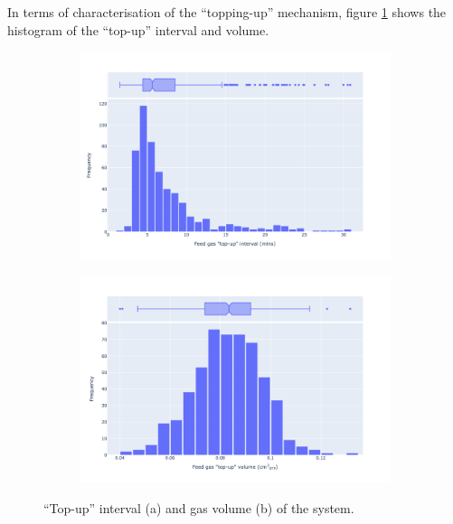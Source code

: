 In terms of characterisation of the ``topping-up'' mechanism, figure \ref{fig:top_up_characteristics} shows the histogram of the ``top-up'' interval and volume. 

\begin{figure}[h!]
    \centering
    \begin{subfigure}{0.8\linewidth}
        \centering
        \includegraphics[width=\linewidth]{chapter_5/figures/top_up_interval.png}
        \caption{}
    \end{subfigure}
    \begin{subfigure}{0.8\linewidth}
        \centering
        \includegraphics[width=\linewidth]{chapter_5/figures/top_up_volume.png}
        \caption{}
    \end{subfigure}
    \caption{``Top-up'' interval (a) and gas volume (b) of the system.}
    \label{fig:top_up_characteristics}
\end{figure}

